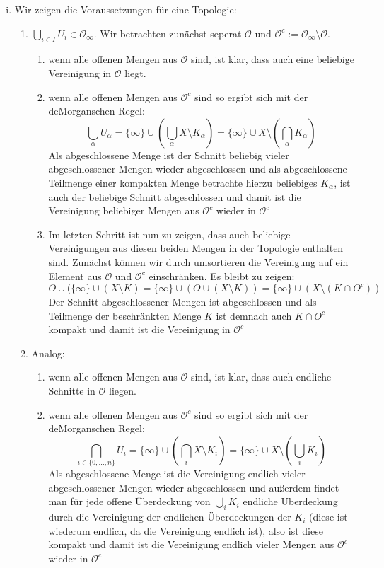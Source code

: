 \documentclass{scrartcl}
\begin{document}
\begin{aufgabe}
\begin{enumerate}[(i)]
\item Wir zeigen die Voraussetzungen für eine Topologie:
\begin{enumerate}[(T1)]
\item $\bigcup_{i\in I} U_i \in \mathcal O_\infty$. Wir betrachten zunächst seperat $ \mathcal O $ und $ \mathcal O^c:=\mathcal O_\infty \setminus \mathcal O $. 
\begin{enumerate}
\item wenn alle offenen Mengen aus $ \mathcal O $ sind, ist klar, dass auch eine beliebige Vereinigung in $ \mathcal O$ liegt.
\item wenn alle offenen Mengen aus $ \mathcal O^c $ sind so ergibt sich mit der deMorganschen Regel:
\[
 \bigcup_\alpha U_\alpha=\{\infty\} \cup (\bigcup_\alpha X\setminus K_\alpha)= \{\infty\} \cup X\setminus (\bigcap_\alpha K_\alpha) 
\]
Als abgeschlossene Menge ist der Schnitt beliebig vieler abgeschlossener Mengen wieder abgeschlossen und als abgeschlossene Teilmenge einer kompakten Menge betrachte hierzu beliebiges $ K_\alpha $, ist auch der beliebige Schnitt abgeschlossen und damit ist die Vereinigung beliebiger Mengen aus $ \mathcal O^c $ wieder in $ \mathcal O^c $
\item Im letzten Schritt ist nun zu zeigen, dass auch beliebige Vereinigungen aus diesen beiden Mengen in der Topologie enthalten sind.  Zunächst können wir durch umsortieren die Vereinigung auf ein Element aus $ \mathcal O $ und $ \mathcal O^c $ einschränken. Es bleibt zu zeigen:
\[
O\cup (\{\infty\} \cup (X\setminus K)=\{\infty\}\cup (O\cup(X\setminus K))=\{\infty\}\cup (X\setminus (K\cap O^c))
\]
Der Schnitt abgeschlossener Mengen ist abgeschlossen und als Teilmenge der beschränkten Menge $ K $ ist demnach auch $ K\cap O^c $ kompakt und damit ist die Vereinigung in $ \mathcal O^c $
\end{enumerate}
\item Analog: 
\begin{enumerate}
\item wenn alle offenen Mengen aus $ \mathcal O $ sind, ist klar, dass auch endliche Schnitte in $ \mathcal O$ liegen.
\item wenn alle offenen Mengen aus $ \mathcal O^c $ sind so ergibt sich mit der deMorganschen Regel:
\[
 \bigcap_{i\in \{0,...,n\}} U_{i}=\{\infty\} \cup (\bigcap_i X\setminus K_i)= \{\infty\} \cup X\setminus (\bigcup_i K_i) 
\]
Als abgeschlossene Menge ist die Vereinigung endlich vieler abgeschlossener Mengen wieder abgeschlossen und außerdem findet man für jede offene Überdeckung von $ \bigcup_i K_i $ endliche Überdeckung durch die Vereinigung der endlichen Überdeckungen der $ K_i $ (diese ist wiederum endlich, da die Vereinigung endlich ist), also ist diese kompakt und damit ist die Vereinigung endlich vieler Mengen aus $ \mathcal O^c $ wieder in $ \mathcal O^c $

\end{enumerate}
\end{enumerate}
\end{enumerate}
\end{aufgabe}
\end{document}
